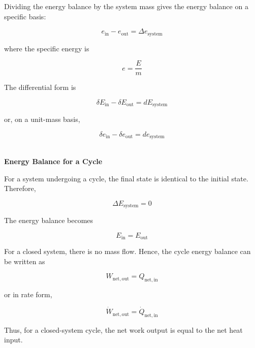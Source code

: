 \documentclass[12pt]{article}
\begin{document}
Dividing the energy balance by the system mass gives the energy balance on a specific basis:

\begin{equation*}
e_{\mathrm{in}}-e_{\mathrm{out}}
=
\Delta e_{\mathrm{system}}
\end{equation*}

where the specific energy is

\begin{equation*}
e=\frac{E}{m}
\end{equation*}

The differential form is

\begin{equation*}
\delta E_{\mathrm{in}}-\delta E_{\mathrm{out}}
=
dE_{\mathrm{system}}
\end{equation*}

or, on a unit-mass basis,

\begin{equation*}
\delta e_{\mathrm{in}}-\delta e_{\mathrm{out}}
=
de_{\mathrm{system}}
\end{equation*}



\textbf{\\ Energy Balance for a Cycle}

For a system undergoing a cycle, the final state is identical to the initial state. Therefore,

\begin{equation*}
\Delta E_{\mathrm{system}}=0
\end{equation*}

The energy balance becomes

\begin{equation*}
E_{\mathrm{in}}=E_{\mathrm{out}}
\end{equation*}

For a closed system, there is no mass flow. Hence, the cycle energy balance can be written as

\begin{equation*}
W_{\mathrm{net,out}}
=
Q_{\mathrm{net,in}}
\end{equation*}

or in rate form,

\begin{equation*}
\dot{W}_{\mathrm{net,out}}
=
\dot{Q}_{\mathrm{net,in}}
\end{equation*}

Thus, for a closed-system cycle, the net work output is equal to the net heat input. 
\end{document}
